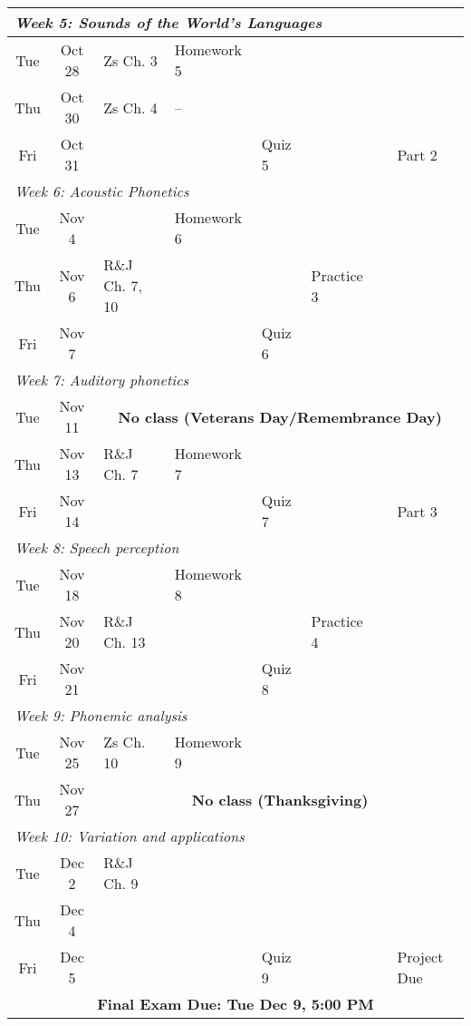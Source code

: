 \documentclass[12pt, letterpaper]{article}
\begin{document}
\begin{longtable}{|c|c|l|p{3cm}|p{1.25cm}|l|l|l|}
\multicolumn{8}{|l|}{\textit{Week 5: Sounds of the World's Languages}} \\ \hline
Tue & Oct 28  & Zs Ch. 3 & Homework 5 & & & & \\ \hline
Thu & Oct 30  & Zs Ch. 4 & -- & & & & \\ \hline
Fri & Oct 31  & & & Quiz 5 & & & Part 2 \\ \hline

\multicolumn{8}{|l|}{\textit{Week 6: Acoustic Phonetics}} \\ \hline
Tue & Nov 4   &  & Homework 6 & & & & \\ \hline
Thu & Nov 6   & R\&J Ch. 7, 10 &  & & Practice 3 & & \\ \hline
Fri & Nov 7   & & & Quiz 6 & & & \\ \hline

\multicolumn{8}{|l|}{\textit{Week 7: Auditory phonetics}} \\ \hline
Tue & Nov 11  & \multicolumn{6}{c|}{\textbf{No class (Veterans Day/Remembrance Day)}} \\ \hline
Thu & Nov 13  & R\&J Ch. 7 & Homework 7 & & & & \\ \hline
Fri & Nov 14  & & & Quiz 7 & & & Part 3 \\ \hline

\multicolumn{8}{|l|}{\textit{Week 8: Speech perception}} \\ \hline
Tue & Nov 18  & & Homework 8 & & & & \\ \hline
Thu & Nov 20  & R\&J Ch. 13 & & & Practice 4 & & \\ \hline
Fri & Nov 21  & & & Quiz 8 & & & \\ \hline

\multicolumn{8}{|l|}{\textit{Week 9: Phonemic analysis }} \\ \hline
Tue & Nov 25  & Zs Ch. 10 & Homework 9 & & & & \\ \hline
Thu & Nov 27  & \multicolumn{6}{c|}{\textbf{No class (Thanksgiving)}} \\ \hline

\multicolumn{8}{|l|}{\textit{Week 10: Variation and applications}} \\ \hline
Tue & Dec 2   & R\&J Ch. 9 & & & & & \\ \hline
Thu & Dec 4   & & & &  & & \\ \hline
Fri & Dec 5   & & & Quiz 9 & & & Project Due \\ \hline

\multicolumn{8}{|c|}{\textbf{Final Exam Due: Tue Dec 9, 5:00 PM}} \\ \hline
\end{longtable}



\end{document}
